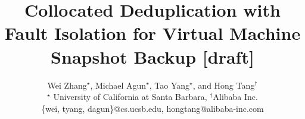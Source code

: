 \documentclass[letterpaper,twocolumn,10pt]{article}
\begin{document}
\title{Collocated Deduplication with Fault Isolation for Virtual Machine Snapshot Backup [draft]}

\author{
  Wei Zhang$^{\star}$, Michael Agun$^\star$, Tao Yang$^\star$, and Hong Tang$^\dagger$ \\
  {\normalsize$^\star$  University of California at Santa Barbara}, {\normalsize$^\dagger$Alibaba Inc.} \\
  \{wei, tyang, dagun\}@cs.ucsb.edu, hongtang@alibaba-inc.com
}

\maketitle











\end{document}

